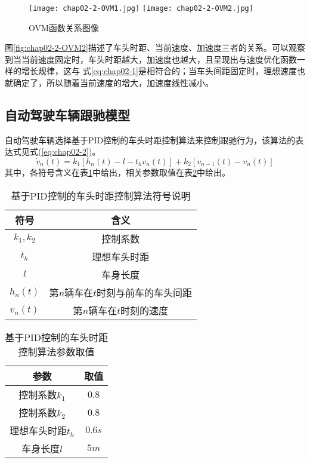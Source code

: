 \begin{figure}
  \centering
    {\texttt{[image: chap02-2-OVM1.jpg]}}
    {\texttt{[image: chap02-2-OVM2.jpg]}}
  \caption{OVM函数关系图像}
  \label{fig:chap02-2-OVM}
\end{figure}

图\ref{fig:chap02-2-OVM2}描述了车头时距、当前速度、加速度三者的关系。可以观察到当当前速度固定时，车头时距越大，加速度也越大，且呈现出与速度优化函数一样的增长规律，这与
式\ref{eq:chap02-1}是相符合的；当车头间距固定时，理想速度也就确定了，所以随着当前速度的增大，加速度线性减小。

\subsection{自动驾驶车辆跟驰模型}

自动驾驶车辆选择基于PID控制的车头时距控制算法来控制跟驰行为，该算法的表达式见式(\ref{eq:chap02-2})。
\begin{equation}
  \dot{v}_n(t) = k_1 \left[ h_n(t) - l - t_hv_n(t) \right] + k_2 \left[ v_{n-1}(t) - v_n(t) \right]
  \label{eq:chap02-2}
\end{equation}
其中，各符号含义在表\ref{tab:chap02-2}中给出，相关参数取值在表\ref{tab:chap02-added}中给出。

\begin{table}
  \centering
  \caption{基于PID控制的车头时距控制算法符号说明}
  \begin{tabular}{cc}
    \toprule
    符号          &  含义                         \\
    \midrule
    $k_1, k_2$            & 控制系数         \\
    $t_h$                 & 理想车头时距             \\
    $l$                   & 车身长度          \\
    $h_n(t)$              & 第$n$辆车在$t$时刻与前车的车头间距        \\
    $v_n(t)$              & 第$n$辆车在$t$时刻的速度 \\
    \bottomrule
  \end{tabular}
  \label{tab:chap02-2}
\end{table}

\begin{table}
  \centering
  \caption{基于PID控制的车头时距控制算法参数取值}
  \begin{tabular}{cc}
    \toprule
    参数          &  取值                         \\
    \midrule
    控制系数$k_1$          & 0.8         \\
    控制系数$k_2$          & 0.8     \\
    理想车头时距$t_h$       & $0.6s$             \\
    车身长度$l$            & $5m$         \\
    \bottomrule
  \end{tabular}
  \label{tab:chap02-added}
\end{table}

